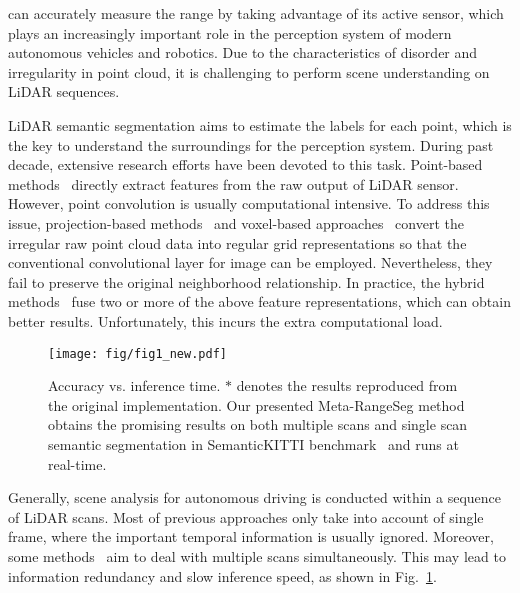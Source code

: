 \documentclass[letterpaper, 10 pt, journal, twoside]{ieeetran}
\begin{document}
 can accurately measure the range by taking advantage of its active sensor, which plays an increasingly important role in the perception system of modern autonomous vehicles and robotics. Due to the characteristics of disorder and irregularity in point cloud, it is challenging to perform scene understanding on LiDAR sequences.

LiDAR semantic segmentation aims to estimate the labels for each point, which is the key to understand the surroundings for the perception system. During past decade, extensive research efforts have been devoted to this task. Point-based methods~\cite{qi2017pointnet, qi2017pointnet++, hu2020randla} directly extract features from the raw output of LiDAR sensor. However, point convolution is usually computational intensive. To address this issue, projection-based methods~\cite{wu2019squeezesegv2,milioto2019rangenet++,cortinhal2020salsanext} and voxel-based approaches~\cite{graham20183d, yan2021sparse, zhu2021cylindrical} convert the irregular raw point cloud data into regular grid representations so that the conventional convolutional layer for image can be employed. Nevertheless, they fail to preserve the original neighborhood relationship. In practice, the hybrid methods~\cite{zhang2020deep, tang2020searching, xu2021rpvnet} fuse two or more of the above feature representations, which can obtain better results. Unfortunately, this incurs the extra computational load. 

\begin{figure}
\centering
\setlength{\abovecaptionskip}{-0.2cm}
\texttt{[image: fig/fig1\_new.pdf]}
    \caption{Accuracy vs. inference time. $*$ denotes the results reproduced from the original implementation. Our presented Meta-RangeSeg method obtains the promising results on both multiple scans and single scan semantic segmentation in SemanticKITTI benchmark~\cite{behley2019semantickitti} and runs at real-time.}
    \label{fig:first}
    \vspace{-6mm}
\end{figure}


Generally, scene analysis for autonomous driving is conducted within a sequence of LiDAR scans. Most of previous approaches only take into account of single frame, where the important temporal information is usually ignored. Moreover, some methods~\cite{sun2021pointmoseg, shi2020spsequencenet, zhu2021cylindrical} aim to deal with multiple scans simultaneously. This may lead to information redundancy and slow inference speed, as shown in Fig.~\ref{fig:first}. 
\end{document}
